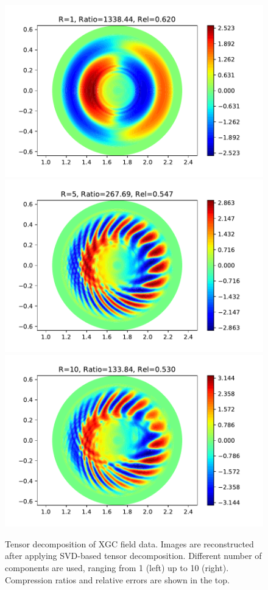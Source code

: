 \begin{figure}[!h]
  \centering
  \includegraphics[width=0.32\linewidth]{Figs/tensor-1.pdf}
  \includegraphics[width=0.32\linewidth]{Figs/tensor-5.pdf}
  \includegraphics[width=0.32\linewidth]{Figs/tensor-10.pdf}
  \caption{Tensor decomposition of XGC field data. Images are reconstructed after applying SVD-based tensor decomposition. Different number of components are used, ranging from 1 (left) up to 10 (right). Compression ratios and relative errors are shown in the top.}
  \label{fig:tensor-xgc}
\end{figure}


